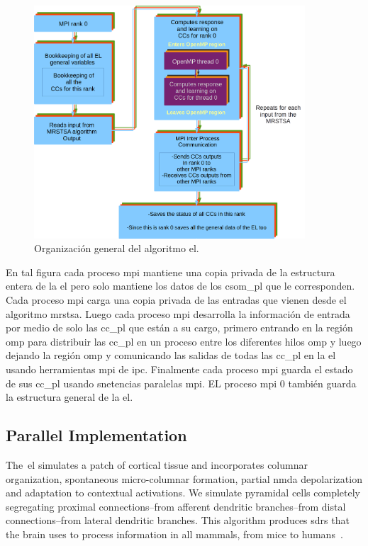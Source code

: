 {\begin{figure}[ht]
    \centering
    \includegraphics[width=0.9\textwidth]{EL_ALG.png}
    \caption{Organización general del algoritmo \gls{el}.} 
    \label{fig:EL_ALG}
\end{figure}

En tal figura cada proceso \gls{mpi} mantiene una copia privada de la estructura entera de la \gls{el} pero solo mantiene los datos de los \gls{csom_pl} que le corresponden.
Cada proceso \gls{mpi} carga una copia privada de las entradas que vienen desde el algoritmo \gls{mrstsa}.
Luego cada proceso \gls{mpi} desarrolla la información de entrada por medio de solo las \gls{cc_pl} que están a su cargo, primero entrando en la región \gls{omp} para distribuir las \gls{cc_pl} en un proceso entre los diferentes hilos \gls{omp} y luego dejando la región \gls{omp} y comunicando las salidas de todas las \gls{cc_pl} en la \gls{el} usando herramientas \gls{mpi} de \gls{ipc}.
Finalmente cada proceso \gls{mpi} guarda el estado de sus \gls{cc_pl} usando snetencias paralelas \gls{mpi}.
EL proceso \gls{mpi} 0 también guarda la estructura general de la \gls{el}.
}{
\subsection{ Parallel Implementation}
\label{EL_Parallelization}

The~\gls{el} simulates a patch of cortical tissue and incorporates columnar organization, spontaneous micro-columnar formation, partial \gls{nmda} depolarization and adaptation to contextual activations. We simulate pyramidal cells completely segregating proximal connections--from afferent dendritic branches--from distal connections--from lateral dendritic branches. This algorithm produces \glspl{sdr} that the brain uses to process information in all mammals, from mice to humans~\cite{barth_2012}.

}
